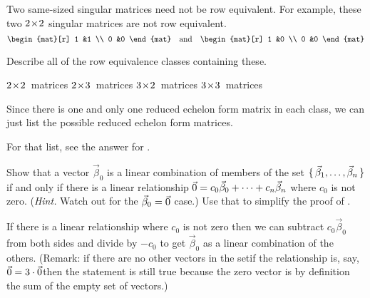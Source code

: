 \begin{exercises}
\begin{answer}
      Two same-sized singular matrices need not be row equivalent.
      For example, these two \( 2 \! \times \! 2 \) singular matrices
      are not row equivalent.
      \begin{equation*}
        \begin{mat}[r]
          1  &1  \\
          0  &0
        \end{mat}
        \quad\text{and}\quad
        \begin{mat}[r]
          1  &0  \\
          0  &0
        \end{mat}
      \end{equation*}  
    \end{answer}
  \recommended \item 
    Describe all of the row equivalence classes containing these.
    \begin{exparts*}
      \partsitem \( 2 \! \times \! 2 \)~matrices
      \partsitem \( 2 \! \times \! 3 \)~matrices
      \partsitem \( 3 \! \times \! 2 \)~matrices
      \partsitem \( 3 \! \times \! 3 \)~matrices
    \end{exparts*}
    \begin{answer}
      Since there is one and only one reduced echelon form matrix in each
      class, we can just list the possible reduced echelon form matrices.

      For that list, see the answer for . 
    \end{answer}
  \item  
     \begin{exparts}
          \partsitem Show that a vector $\vec{\beta}_0$ is a linear combination
            of members of the set $\mbox{$\{\,\vec{\beta}_1,\ldots,\vec{\beta}_n\,\}$}$
            if and only if there is a linear relationship 
            $\vec{0}=c_0\vec{\beta}_0+\cdots+c_n\vec{\beta}_n$
            where $c_0$ is not zero.
            (\textit{Hint.}   Watch out for the $\vec{\beta}_0=\vec{0}$ case.)
         \partsitem Use that to simplify the proof of 
            .   
       \end{exparts}
       \begin{answer}
          \begin{exparts}
           \partsitem If there is a linear relationship where $c_0$ is not zero
             then we can subtract $c_0\vec{\beta}_0$ from both sides and divide
             by $-c_0$ to get $\vec{\beta}_0$ as a linear
             combination of the others.
             (Remark:  
             if there are no other vectors in the set\Dash if the 
             relationship is, say, 
             $\vec{0}=3\cdot\vec{0}$\Dash then the statement is still true because
             the zero vector is by definition the sum of the empty set 
             of vectors.)


\end{exparts}
\end{answer}
\end{exercises}

